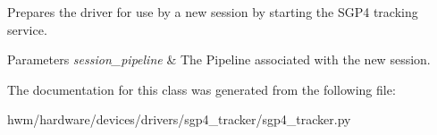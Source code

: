 Prepares the driver for use by a new session by starting the S\-G\-P4 tracking service. 


\begin{DoxyParams}{Parameters}
{\em session\-\_\-pipeline} & The Pipeline associated with the new session. \\
\hline
\end{DoxyParams}


The documentation for this class was generated from the following file\-:\begin{DoxyCompactItemize}
\item 
hwm/hardware/devices/drivers/sgp4\-\_\-tracker/sgp4\-\_\-tracker.\-py\end{DoxyCompactItemize}
